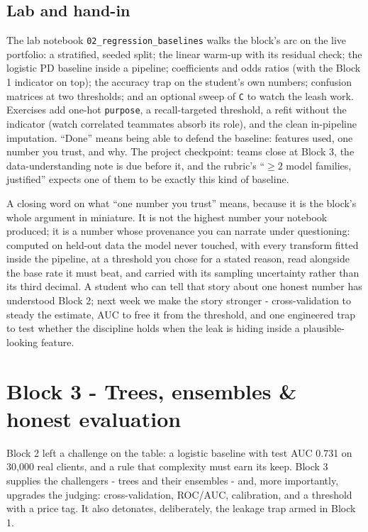 \documentclass[11pt,a4paper]{article}
\begin{document}
\subsection{Lab and hand-in}
The lab notebook \texttt{02\_regression\_baselines} walks the block's arc
on the live portfolio: a stratified, seeded split; the linear warm-up with
its residual check; the logistic PD baseline inside a pipeline;
coefficients and odds ratios (with the Block 1 indicator on top); the
accuracy trap on the student's own numbers; confusion matrices at two
thresholds; and an optional sweep of \texttt{C} to watch the leash work.
Exercises add one-hot \texttt{purpose}, a recall-targeted threshold, a
refit without the indicator (watch correlated teammates absorb its role),
and the clean in-pipeline imputation. ``Done'' means being able to defend
the baseline: features used, one number you trust, and why. The project
checkpoint: teams close at Block 3, the data-understanding note is due
before it, and the rubric's ``$\geq 2$ model families, justified'' expects
one of them to be exactly this kind of baseline.

A closing word on what ``one number you trust'' means, because it is the
block's whole argument in miniature. It is not the highest number your
notebook produced; it is a number whose provenance you can narrate under
questioning: computed on held-out data the model never touched, with
every transform fitted inside the pipeline, at a threshold you chose for
a stated reason, read alongside the base rate it must beat, and carried
with its sampling uncertainty rather than its third decimal. A student
who can tell that story about one honest number has understood Block 2;
next week we make the story stronger - cross-validation to steady the
estimate, AUC to free it from the threshold, and one engineered trap to
test whether the discipline holds when the leak is hiding inside a
plausible-looking feature.

\section{Block 3 - Trees, ensembles \& honest evaluation}

Block 2 left a challenge on the table: a logistic baseline with test AUC
0.731 on 30{,}000 real clients, and a rule that complexity must earn its keep. Block 3 supplies the
challengers - trees and their ensembles - and, more importantly,
upgrades the judging: cross-validation, ROC/AUC, calibration, and a
threshold with a price tag. It also detonates, deliberately, the leakage
trap armed in Block 1.
\end{document}
